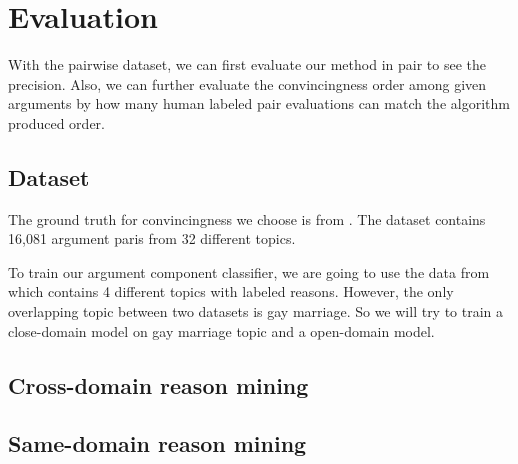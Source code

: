 \documentclass[11pt,a4paper]{article}
\begin{document}
\section{Evaluation}

With the pairwise dataset, we can first evaluate our method in pair to see the precision. Also, we can further evaluate the convincingness order among given arguments by how many human labeled pair evaluations can match the algorithm produced order. 

\subsection{Dataset}

The ground truth for convincingness we choose is from \cite{habernal2016argument}. The dataset contains 16,081 argument paris from 32 different topics. 

To train our argument component classifier, we are going to use the data from \cite{hasan2014you} which contains 4 different topics with labeled reasons. However, the only overlapping topic between two datasets is gay marriage. So we will try to train a close-domain model on gay marriage topic and a open-domain model. 

\subsection{Cross-domain reason mining}

\subsection{Same-domain reason mining}



% 
%


\end{document}
